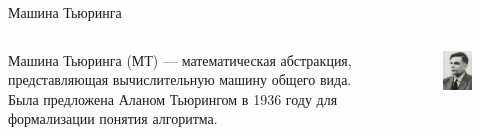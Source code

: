 \documentclass[newPxFont]{beamer}
\begin{document}
\begin{frame}{Машина Тьюринга}
\begin{columns}
\begin{column}{.48\linewidth}
Машина Тьюринга (МТ) — математическая абстракция, представляющая вычислительную машину общего вида. Была предложена 		Аланом Тьюрингом в 1936 году для формализации понятия алгоритма.
\end{column}
\begin{column}{.48\linewidth}
		\begin{figure}
		\centerline{\includegraphics[width=1.0\linewidth]{images/al_t.jpg}}
		\end{figure}
	\end{column}
	\end{columns}
\end{frame}


\end{document}
